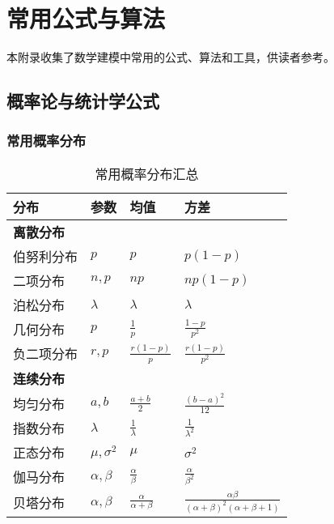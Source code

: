 
\chapter{常用公式与算法}\label{app:formulas-algorithms}

本附录收集了数学建模中常用的公式、算法和工具，供读者参考。

\section{概率论与统计学公式}\label{app:probability-statistics}

\subsection{常用概率分布}

\begin{table}[htbp]
    \centering
    \caption{常用概率分布汇总}
    \label{tab:app-distributions}
    \begin{tabular}{@{}llll@{}}
        \toprule
        分布 & 参数 & 均值 & 方差 \\
        \midrule
        \multicolumn{4}{l}{\textbf{离散分布}} \\
        \midrule
        伯努利分布 & $p$ & $p$ & $p(1-p)$ \\
        二项分布 & $n, p$ & $np$ & $np(1-p)$ \\
        泊松分布 & $\lambda$ & $\lambda$ & $\lambda$ \\
        几何分布 & $p$ & $\frac{1}{p}$ & $\frac{1-p}{p^2}$ \\
        负二项分布 & $r, p$ & $\frac{r(1-p)}{p}$ & $\frac{r(1-p)}{p^2}$ \\
        \midrule
        \multicolumn{4}{l}{\textbf{连续分布}} \\
        \midrule
        均匀分布 & $a, b$ & $\frac{a+b}{2}$ & $\frac{(b-a)^2}{12}$ \\
        指数分布 & $\lambda$ & $\frac{1}{\lambda}$ & $\frac{1}{\lambda^2}$ \\
        正态分布 & $\mu, \sigma^2$ & $\mu$ & $\sigma^2$ \\
        伽马分布 & $\alpha, \beta$ & $\frac{\alpha}{\beta}$ & $\frac{\alpha}{\beta^2}$ \\
        贝塔分布 & $\alpha, \beta$ & $\frac{\alpha}{\alpha+\beta}$ & $\frac{\alpha\beta}{(\alpha+\beta)^2(\alpha+\beta+1)}$ \\
        \bottomrule
    \end{tabular}
\end{table}

